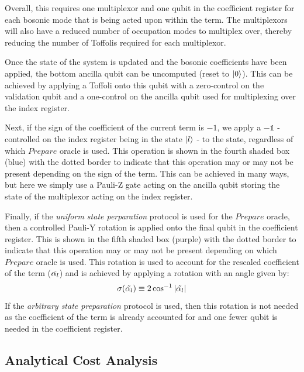 Overall, this requires one multiplexor and one qubit in the coefficient register for each bosonic mode that is being acted upon within the term.
The multiplexors will also have a reduced number of occupation modes to multiplex over, thereby reducing the number of Toffolis required for each multiplexor.

Once the state of the system is updated and the bosonic coefficients have been applied, the bottom ancilla qubit can be uncomputed (reset to $\ket{0}$).
This can be achieved by applying a Toffoli onto this qubit with a zero-control on the validation qubit and a one-control on the ancilla qubit used for multiplexing over the index register.

Next, if the sign of the coefficient of the current term is $-1$, we apply a $- \mathds{1}$ - controlled on the index register being in the state $\ket{l}$ - to the state, regardless of which $Prepare$ oracle is used.
This operation is shown in the fourth shaded box (blue) with the dotted border to indicate that this operation may or may not be present depending on the sign of the term.
This can be achieved in many ways, but here we simply use a Pauli-Z gate acting on the ancilla qubit storing the state of the multiplexor acting on the index register.

Finally, if the \textit{uniform state perparation} protocol is used for the $Prepare$ oracle, then a controlled Pauli-Y rotation is applied onto the final qubit in the coefficient register.
This is shown in the fifth shaded box (purple) with the dotted border to indicate that this operation may or may not be present depending on which $Prepare$ oracle is used.
This rotation is used to account for the rescaled coefficient of the term ($\Tilde{\alpha_l}$) and is achieved by applying a rotation with an angle given by:
\begin{equation}
    \sigma(\Tilde{\alpha_l}) \equiv 2 \cos^{-1}{|\Tilde{\alpha_l}|}
\end{equation}
If the \textit{arbitrary state preparation} protocol is used, then this rotation is not needed as the coefficient of the term is already accounted for and one fewer qubit is needed in the coefficient register.


\subsection{Analytical Cost Analysis}
\label{subsec:analytics}


